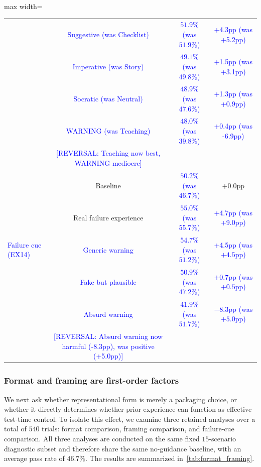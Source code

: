\documentclass{article}
\newcommand{\blue}[1]{\textcolor{blue}{#1}}
\begin{document}
\begin{table}[t]
\begin{adjustbox}{max width=\columnwidth}
\begin{tabular}{lccc}
& \blue{Suggestive (was Checklist)} & \blue{$51.9\%$ (was $51.9\%$)} & \blue{+4.3pp (was +5.2pp)} \\
& \blue{Imperative (was Story)} & \blue{$49.1\%$ (was $49.8\%$)} & \blue{+1.5pp (was +3.1pp)} \\
& \blue{Socratic (was Neutral)} & \blue{$48.9\%$ (was $47.6\%$)} & \blue{+1.3pp (was +0.9pp)} \\
& \blue{WARNING (was Teaching)} & \blue{$48.0\%$ (was $39.8\%$)} & \blue{+0.4pp (was -6.9pp)} \\
& \blue{[REVERSAL: Teaching now best, WARNING mediocre]} & & \\
\midrule
\multirow{5}{*}{\blue{Failure cue (EX14)}}
& Baseline & \blue{$50.2\%$ (was $46.7\%$)} & $+0.0$pp \\
& \cellcolor{bestRow} Real failure experience & \cellcolor{bestRow} \blue{$55.0\%$ (was $55.7\%$)} & \cellcolor{bestRow}\blue{+4.7pp (was +9.0pp)} \\
& \blue{Generic warning} & \blue{$54.7\%$ (was $51.2\%$)} & \blue{+4.5pp (was $+4.5$pp)} \\
& \blue{Fake but plausible} & \blue{$50.9\%$ (was $47.2\%$)} & \blue{$+0.7$pp (was $+0.5$pp)} \\
& \blue{Absurd warning} & \blue{$41.9\%$ (was $51.7\%$)} & \blue{$-8.3$pp (was $+5.0$pp)} \\
& \blue{[REVERSAL: Absurd warning now harmful (-8.3pp), was positive (+5.0pp)]} & & \\
\bottomrule
\end{tabular}
\end{adjustbox}
\end{table}

\subsubsection{Format and framing are first-order factors}

We next ask whether representational form is merely a packaging choice, or whether it directly determines whether prior experience can function as effective test-time control. To isolate this effect, we examine three retained analyses over a total of $540$ trials: format comparison, framing comparison, and failure-cue comparison. All three analyses are conducted on the same fixed $15$-scenario diagnostic subset and therefore share the same no-guidance baseline, with an average pass rate of $46.7\%$. The results are summarized in~\cref{tab:format_framing}.
\end{document}
